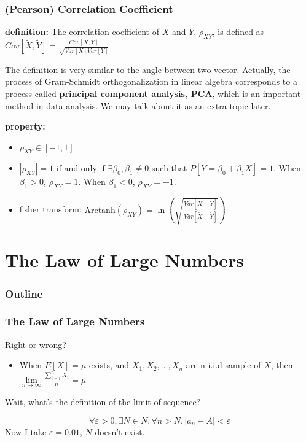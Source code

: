 \documentclass{beamer}
\begin{document}
\begin{frame}
    \frametitle{(Pearson) Correlation Coefficient}
    \textbf{definition:} The correlation coefficient of $X$ and $Y$, $\rho_{XY}$, is defined as $Cov[\tilde{X}, \tilde{Y}]=\frac{Cov[X,Y]}{\sqrt{Var[X]Var[Y]}}$\par
    The definition is very similar to the angle between two vector. Actually, the process of Gram-Schmidt orthogonalization in linear algebra corresponds to a process called \textbf{principal component analysis, PCA}, which is an important method in data analysis. We may talk about it as an extra topic later.\par
    \textbf{property:} 
    \begin{itemize}
        \item $\rho_{XY}\in[-1,1]$
        \item $|\rho_{XY}|=1$ if and only if $\exists \beta_{0}, \beta_{1}\neq 0$ such that $P[Y=\beta_{0}+\beta_{1}X]=1$. When $\beta_{1}>0$, $\rho_{XY}=1$. When $\beta_{1}<0$, $\rho_{XY}=-1$.
        \item fisher transform: $\text{Arctanh}(\rho_{XY})=\ln(\sqrt{\frac{Var[\tilde{X}+\tilde{Y}]}{Var[\tilde{X}-\tilde{Y}]}})$
    \end{itemize}
    
\end{frame}

\section{The Law of Large Numbers}
\begin{frame}
    \frametitle{Outline}
    \tableofcontents[currentsection]
\end{frame}

\begin{frame}
    \frametitle{The Law of Large Numbers}
    Right or wrong? 
    \begin{itemize}
        \item When $E[X]=\mu$ exists, and $X_1, X_2, \dots , X_n$ are n i.i.d sample of $X$, then $\lim\limits_{n\rightarrow\infty} \frac{\sum\limits_{i=1}^{n}X_i}{n}=\mu$
    \end{itemize}
    Wait, what's the definition of the limit of sequence?\par
    \[\forall \varepsilon>0, \exists N\in N, \forall n>N, |a_{n}-A|<\varepsilon\]
    Now I take $\varepsilon=0.01$, $N$ doesn't exist.
    

\end{frame}
\end{document}
